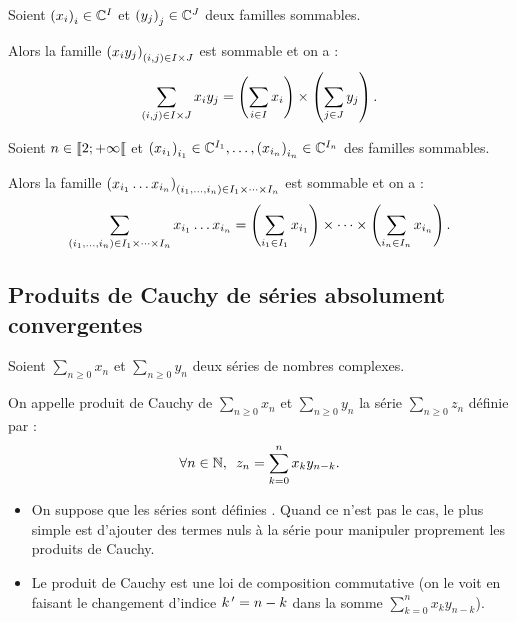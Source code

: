 \begin{cor}
Soient \(\left(x_i\right)_i\in\mathbb{C}^I\) et \(\left(y_j\right)_j\in\mathbb{C}^J\) deux familles sommables.

Alors la famille \(\left(x_iy_j\right)_{\left(i,j\right)\in I\times J}\) est sommable et on a : \[\sum_{\left(i,j\right)\in I\times J}x_iy_j=\left(\sum_{i\in I}x_i\right)\times\left(\sum_{j\in J}y_j\right).\]
\end{cor}

\begin{cor}
Soient \(n\in\left\llbracket2;+\infty\right\llbracket\) et \(\left(x_{i_1}\right)_{i_1}\in\mathbb{C}^{I_1},\dots,\left(x_{i_n}\right)_{i_n}\in\mathbb{C}^{I_n}\) des familles sommables.

Alors la famille \(\left(x_{i_1}\dots x_{i_n}\right)_{\left(i_1,\dots,i_n\right)\in I_1\times\dots\times I_n}\) est sommable et on a : \[\sum_{\left(i_1,\dots,i_n\right)\in I_1\times\dots\times I_n}x_{i_1}\dots x_{i_n}=\left(\sum_{i_1\in I_1}x_{i_1}\right)\times\dots\times\left(\sum_{i_n\in I_n}x_{i_n}\right).\]
\end{cor}

\subsection{Produits de Cauchy de séries absolument convergentes}

\begin{defi}
Soient \(\sum_{n\geq0}x_n\) et \(\sum_{n\geq0}y_n\) deux séries de nombres complexes.

On appelle produit de Cauchy de \(\sum_{n\geq0}x_n\) et \(\sum_{n\geq0}y_n\) la série \(\sum_{n\geq0}z_n\) définie par : \[\quantifs{\forall n\in\N}z_n=\sum_{k=0}^nx_ky_{n-k}.\]
\end{defi}

\begin{rem}
\begin{itemize}
    \item On suppose que les séries sont définies . Quand ce n'est pas le cas, le plus simple est d'ajouter des termes nuls à la série pour manipuler proprement les produits de Cauchy. \\
    \item Le produit de Cauchy est une loi de composition commutative (on le voit en faisant le changement d'indice \(k^{\,\prime}=n-k\) dans la somme \(\sum_{k=0}^nx_ky_{n-k}\)).
\end{itemize}
\end{rem}

